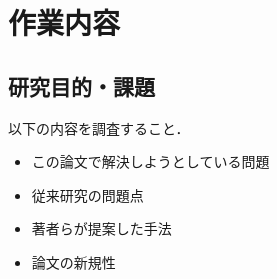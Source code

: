 \documentclass[a4j, twocolumn]{jsarticle}  %
\begin{document}
\section{作業内容}

\subsection{研究目的・課題}

以下の内容を調査すること．

\begin{itemize}
    \item この論文で解決しようとしている問題
    \item 従来研究の問題点
    \item 著者らが提案した手法
    \item 論文の新規性
\end{itemize}



%





\end{document}
